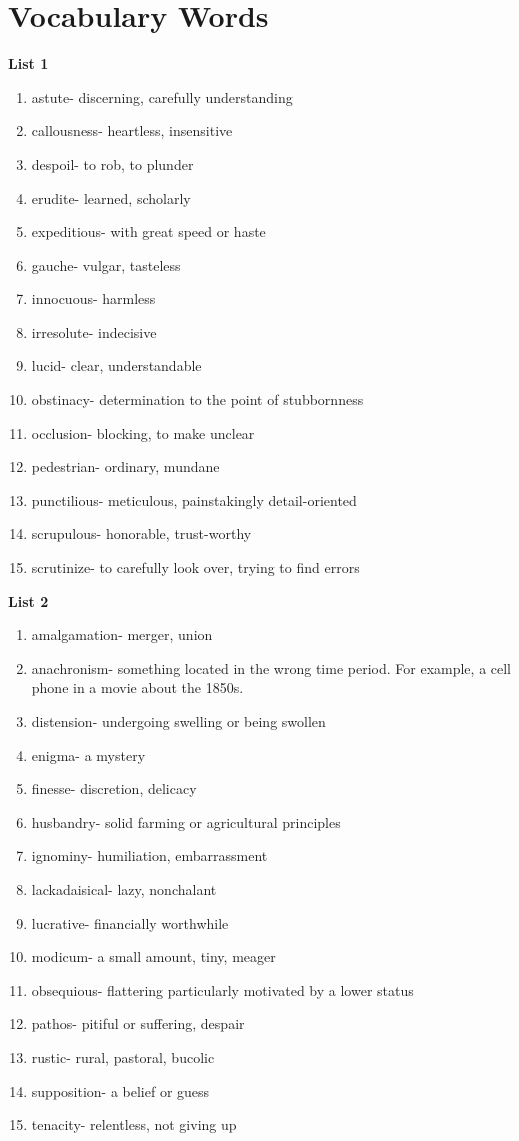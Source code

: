 \section{Vocabulary Words}

\textbf{List 1}

\begin{enumerate}
\item astute- discerning, carefully understanding
\item callousness- heartless, insensitive
\item despoil- to rob, to plunder
\item erudite- learned, scholarly 
\item expeditious- with great speed or haste
\item gauche- vulgar, tasteless
\item innocuous- harmless
\item irresolute- indecisive
\item lucid- clear, understandable
\item obstinacy- determination to the point of stubbornness 
\item occlusion- blocking, to make unclear
\item pedestrian- ordinary, mundane
\item punctilious- meticulous, painstakingly detail-oriented
\item scrupulous- honorable, trust-worthy
\item scrutinize- to carefully look over, trying to find errors
\end{enumerate}

\textbf{List 2}

\begin{enumerate}
\item amalgamation- merger, union
\item anachronism- something located in the wrong time period. For example, a cell phone in a movie about the 1850s. 
\item distension- undergoing swelling or being swollen
\item enigma- a mystery
\item finesse- discretion, delicacy
\item husbandry- solid farming or agricultural principles
\item ignominy- humiliation, embarrassment 
\item lackadaisical- lazy, nonchalant 
\item lucrative- financially worthwhile
\item modicum- a small amount, tiny, meager
\item obsequious- flattering particularly motivated by a lower status
\item pathos- pitiful or suffering, despair
\item rustic- rural, pastoral, bucolic
\item supposition- a belief or guess
\item tenacity- relentless, not giving up
\end{enumerate}

